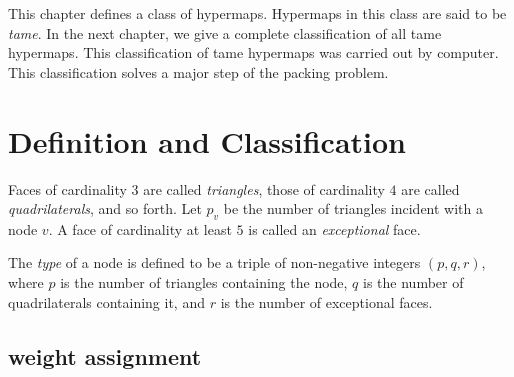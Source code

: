 



\label{sec:tame}


This chapter defines a class of hypermaps.  Hypermaps in this class
are said to be {\it tame}.  In the next chapter, we give a complete
classification of all tame hypermaps.  This classification of tame
hypermaps was carried out by computer.   This classification solves a
major step of the packing problem.

\section{Definition and Classification}


\begin{definition}
Faces of cardinality $3$ are called {\it triangles}, those of
cardinality $4$ are called {\it quadrilaterals}, and so forth. Let
$p_v$ be the number of triangles incident with a node $v$. A face of
cardinality at least $5$ is called an {\it exceptional\/} face.
\end{definition}

\begin{definition}[type,~$(p,q,r)$]\label{definition:type}
The {\it type\/} of a node is defined to be a triple of
non-negative integers $(p,q,r)$, where $p$ is the number of
triangles containing the node, $q$ is the number of quadrilaterals
containing it, and $r$ is the number of exceptional faces.
%
\end{definition}


\subsection{weight assignment}\label{sec:wtassign}

